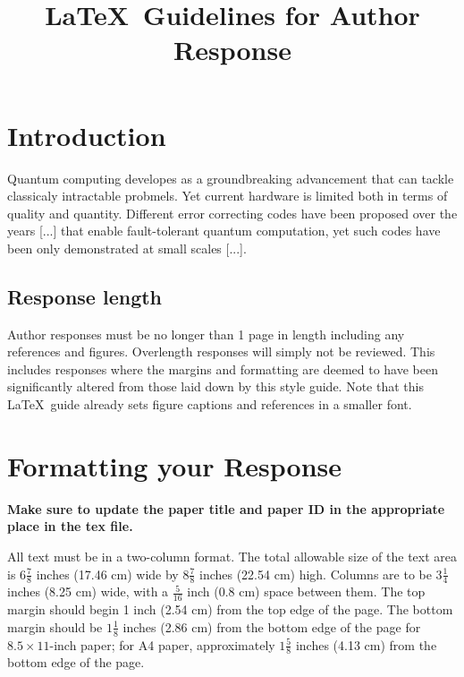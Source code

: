 \documentclass[10pt,twocolumn,letterpaper]{article}
\begin{document}
\title{\LaTeX\ Guidelines for Author Response}  %

\maketitle
\thispagestyle{empty}
\appendix

\section{Introduction}

Quantum computing developes as a groundbreaking advancement that can tackle classicaly intractable probmels. 
Yet current hardware is limited both in terms of quality and quantity. Different error correcting codes have been proposed over the years [...] that 
enable fault-tolerant quantum computation, yet such codes have been only demonstrated at small scales [...].


\subsection{Response length}
Author responses must be no longer than 1 page in length including any references and figures.
Overlength responses will simply not be reviewed.
This includes responses where the margins and formatting are deemed to have been significantly altered from those laid down by this style guide.
Note that this \LaTeX\ guide already sets figure captions and references in a smaller font.

\section{Formatting your Response}

{\bf Make sure to update the paper title and paper ID in the appropriate place in the tex file.}

All text must be in a two-column format.
The total allowable size of the text area is $6\frac78$ inches (17.46 cm) wide by $8\frac78$ inches (22.54 cm) high.
Columns are to be $3\frac14$ inches (8.25 cm) wide, with a $\frac{5}{16}$ inch (0.8 cm) space between them.
The top margin should begin 1 inch (2.54 cm) from the top edge of the page.
The bottom margin should be $1\frac{1}{8}$ inches (2.86 cm) from the bottom edge of the page for $8.5 \times 11$-inch paper;
for A4 paper, approximately $1\frac{5}{8}$ inches (4.13 cm) from the bottom edge of the page.
\end{document}
